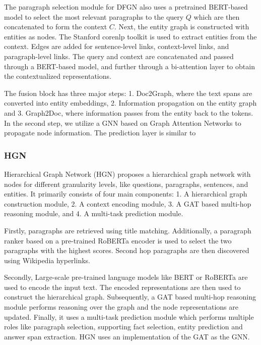 \documentclass[sigplan,screen,nonacm]{acmart}
\begin{document}
The paragraph selection module for DFGN also uses a pretrained BERT-based model \cite{RN153} to select the most relevant paragraphs to the 
query $Q$ which are then concatenated to form the context $C$. Next, the entity graph is constructed with entities as nodes. The Stanford 
corenlp toolkit \cite{RN170} is used to extract entities from the context. Edges are added for sentence-level links, context-level links, 
and paragraph-level links. The query and context are concatenated and passed through a BERT-based model, and further through a bi-attention 
layer to obtain the contextualized representations.

The fusion block has three major steps: 1. Doc2Graph, where the text spans are converted into entity embeddings, 2. Information propagation on 
the entity graph and 3. Graph2Doc, where information passes from the entity back to the tokens. In the second step, we utilize a GNN based on 
Graph Attention Networks \cite{RN7} to propagate node information. The prediction layer is similar to \cite{RN116}

\subsubsection{HGN}
Hierarchical Graph Network (HGN) \cite{RN119} proposes a hierarchical graph network with nodes for different granularity levels, like questions, 
paragraphs, sentences, and entities. It primarily consists of four main components: 1. A hierarchical graph construction module, 2. A context encoding module,
3. A GAT based multi-hop reasoning module, and 4. A multi-task prediction module.

Firstly, paragraphs are retrieved using title matching. Additionally, a paragraph ranker based on a pre-trained RoBERTa encoder is used to select
the two paragraphs with the highest scores. Second hop paragraphs are then discovered using Wikipedia hyperlinks. 

Secondly, Large-scale pre-trained language models like BERT \cite{RN153} or RoBERTa \cite{RN171} are used to encode 
the input text. The encoded representations are then used to construct the hierarchical graph. Subsequently, a GAT based multi-hop reasoning module
performs reasoning over the graph and the node representations are updated.
Finally, it uses a multi-task prediction module which performs multiple roles like paragraph selection, supporting fact selection, entity prediction 
and answer span extraction. HGN uses an implementation of the GAT \cite{RN7} as the GNN.
\end{document}
